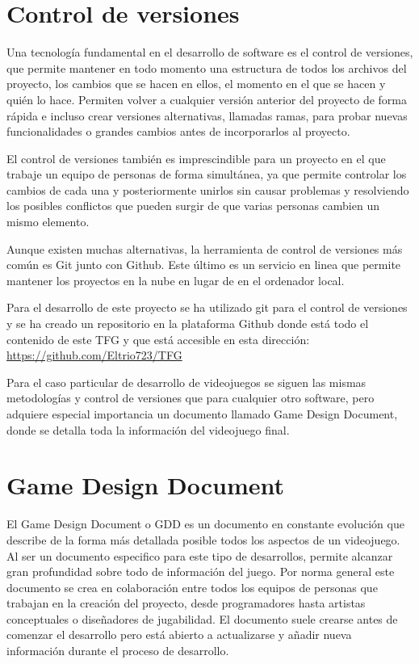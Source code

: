 \section{Control de versiones}

Una tecnología fundamental en el desarrollo de software es el control de versiones, que permite mantener en todo momento una estructura de todos los archivos del proyecto, los cambios que se hacen en ellos, el momento en el que se hacen y quién lo hace. Permiten volver a cualquier versión anterior del proyecto de forma rápida e incluso crear versiones alternativas, llamadas ramas, para probar nuevas funcionalidades o grandes cambios antes de incorporarlos al proyecto. 

El control de versiones también es imprescindible para un proyecto en el que trabaje un equipo de personas de forma simultánea, ya que permite controlar los cambios de cada una y posteriormente unirlos sin causar problemas y resolviendo los posibles conflictos que pueden surgir de que varias personas cambien un mismo elemento.

Aunque existen muchas alternativas, la herramienta de control de versiones más común es Git junto con Github. Este último es un servicio en linea que permite mantener los proyectos en la nube en lugar de en el ordenador local.

Para el desarrollo de este proyecto se ha utilizado git para el control de versiones y se ha creado un repositorio en la plataforma Github donde está todo el contenido de este TFG y que está accesible en esta dirección: \url{https://github.com/Eltrio723/TFG}


Para el caso particular de desarrollo de videojuegos se siguen las mismas metodologías y control de versiones que para cualquier otro software, pero adquiere especial importancia un documento llamado Game Design Document, donde se detalla toda la información del videojuego final.

\section{Game Design Document}

El Game Design Document o GDD es un documento en constante evolución que describe de la forma más detallada posible todos los aspectos de un videojuego. Al ser un documento especifico para este tipo de desarrollos, permite alcanzar gran profundidad sobre todo de información del juego.  Por norma general este documento se crea en colaboración entre todos los equipos de personas que trabajan en la creación del proyecto, desde programadores hasta artistas conceptuales o diseñadores de jugabilidad. El documento suele crearse antes de comenzar el desarrollo pero está abierto a actualizarse y añadir nueva información durante el proceso de desarrollo.


